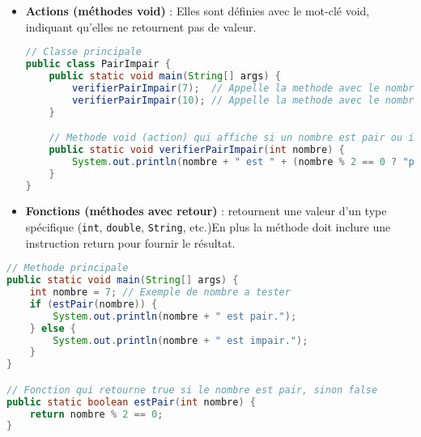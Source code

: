 \documentclass{article}
\begin{document}
\begin{itemize}
    \item \textbf{Actions (méthodes void)} : Elles sont définies avec le mot-clé void, indiquant qu'elles ne retournent pas de valeur.
    \begin{lstlisting}[language=Java]
// Classe principale
public class PairImpair {
    public static void main(String[] args) {
        verifierPairImpair(7);  // Appelle la methode avec le nombre 7
        verifierPairImpair(10); // Appelle la methode avec le nombre 10
    }

    // Methode void (action) qui affiche si un nombre est pair ou impair
    public static void verifierPairImpair(int nombre) {
        System.out.println(nombre + " est " + (nombre % 2 == 0 ? "pair" : "impair") + ".");
    }
}
\end{lstlisting}
    \item \textbf{Fonctions (méthodes avec retour)} : retournent une valeur d'un type spécifique (\texttt{int}, \texttt{double}, \texttt{String}, etc.)En plus la méthode doit inclure une instruction return pour fournir le résultat.
\end{itemize}
 \begin{lstlisting}[language=Java]
// Methode principale
public static void main(String[] args) {
    int nombre = 7; // Exemple de nombre a tester
    if (estPair(nombre)) {
        System.out.println(nombre + " est pair.");
    } else {
        System.out.println(nombre + " est impair.");
    }
}

// Fonction qui retourne true si le nombre est pair, sinon false
public static boolean estPair(int nombre) {
    return nombre % 2 == 0;
}
\end{lstlisting}
\end{document}

